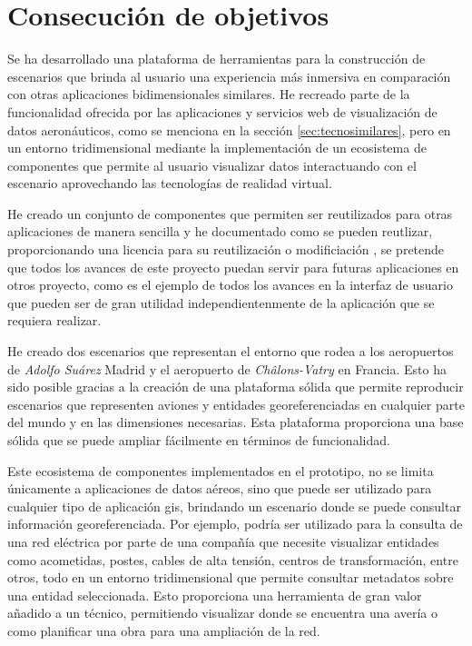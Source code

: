 \documentclass[a4paper, 11pt]{book}
\begin{document}
\section{Consecución de objetivos}
\label{sec:consecucion-objetivos}

Se ha desarrollado una plataforma de herramientas para la construcción de escenarios que brinda al usuario una experiencia más inmersiva en comparación con otras aplicaciones bidimensionales similares. He recreado parte de la funcionalidad ofrecida por las aplicaciones y servicios web de visualización de datos aeronáuticos, como se menciona en la sección \ref{sec:tecnosimilares}, pero en un entorno tridimensional mediante la implementación de un ecosistema de componentes que permite al usuario visualizar datos interactuando con el escenario aprovechando las tecnologías de realidad virtual.

He creado un conjunto de componentes que permiten ser reutilizados para otras aplicaciones de manera sencilla y he documentado como se pueden reutlizar, proporcionando una licencia para su reutilización o modificiación , se pretende que todos los avances de este proyecto puedan servir para futuras aplicaciones en otros proyecto, como es el ejemplo de todos los avances en la interfaz de usuario que pueden ser de gran utilidad independientenmente de la aplicación que se requiera realizar.

He creado dos escenarios que representan el entorno que rodea a los aeropuertos de \emph{Adolfo Suárez} Madrid y el aeropuerto de \emph{Châlons-Vatry} en Francia. Esto ha sido posible gracias a la creación de una plataforma sólida que permite reproducir escenarios que representen aviones y entidades georeferenciadas en cualquier parte del mundo y en las dimensiones necesarias. Esta plataforma proporciona una base sólida que se puede ampliar fácilmente en términos de funcionalidad.

Este ecosistema de componentes implementados en el prototipo, no se limita únicamente a aplicaciones de datos aéreos, sino que puede ser utilizado para cualquier tipo de aplicación \gls{gis}, brindando un escenario donde se puede consultar información georeferenciada. 
Por ejemplo, podría ser utilizado para la consulta de una red eléctrica por parte de una compañía que necesite visualizar entidades como acometidas, postes, cables de alta tensión, centros de transformación, entre otros, todo en un entorno tridimensional que permite consultar metadatos sobre una entidad seleccionada.
Esto proporciona una herramienta de gran valor añadido a un técnico, permitiendo visualizar donde se encuentra una avería o como planificar una obra para una ampliación de la red.
\end{document}

